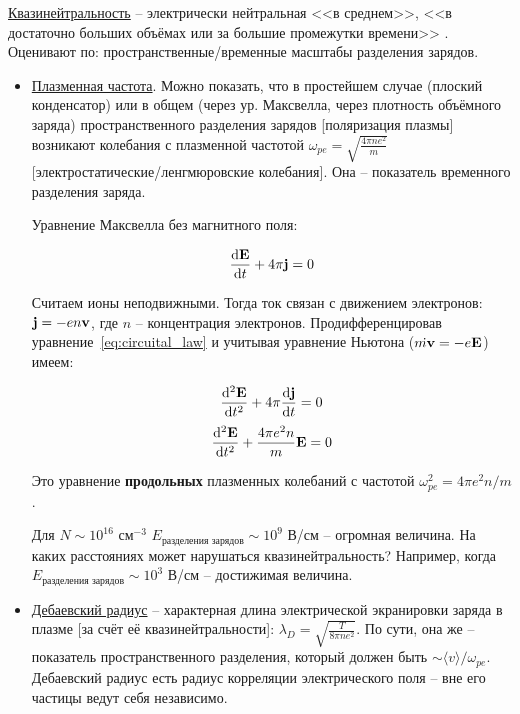\documentclass[10pt, a4paper]{article}
\begin{document}
\uline{Квазинейтральность} -- электрически нейтральная <<в среднем>>, <<в достаточно больших объёмах или за большие промежутки времени>> \cite{frank}. Оценивают по: пространственные/временные масштабы разделения зарядов.

\begin{itemize}
	\item \uline{Плазменная частота}. Можно показать, что в простейшем случае (плоский конденсатор) или в общем (через ур. Максвелла, через плотность объёмного заряда) пространственного разделения зарядов [поляризация плазмы] возникают колебания с плазменной частотой $\omega_{pe} = \sqrt{\frac{4\pi n e^2}{m}}$ [электростатические/ленгмюровские колебания]. Она -- показатель временного разделения заряда.
	
	Уравнение Максвелла без магнитного поля:
	
	\begin{equation}
		\label{eq:circuital_law}
		\dv{\vb{E}}{t} + 4\pi \vb{j} = 0
	\end{equation}

	Считаем ионы неподвижными. Тогда ток связан с движением электронов: $\vb{j}=-en\vb{v}$, где $n$ -- концентрация электронов. Продифференцировав уравнение~\eqref{eq:circuital_law} и учитывая уравнение Ньютона ($\dot{m\vb{v}}=-e\vb{E}$) имеем:
	
	\begin{equation*}
		\dv[2]{\vb{E}}{t}+4\pi\dv{\vb{j}}{t} = 0
	\end{equation*}
	\begin{equation}
		\dv[2]{\vb{E}}{t}+\frac{4\pi e^2 n}{m}\vb{E} = 0 
	\end{equation}

	Это уравнение \textbf{продольных} плазменных колебаний с частотой $\omega_{pe}^2=4\pi e^2 n/m$.
	
	Для $N\sim 10^{16}$ см$^{-3}$ $E_\text{разделения зарядов} \sim 10^9$ В/см -- огромная величина. На каких расстояниях может нарушаться квазинейтральность? Например, когда $E_\text{разделения зарядов} \sim 10^3$ В/см -- достижимая величина.
	
	\item \uline{Дебаевский радиус} -- характерная длина электрической экранировки заряда в плазме [за счёт её квазинейтральности]: $\lambda_D = \sqrt{\frac{T}{8\pi ne^2}}$. По сути, она же -- показатель пространственного разделения, который должен быть $\sim \langle v \rangle/\omega_{pe}$. Дебаевский радиус есть радиус корреляции электрического поля -- вне его частицы ведут себя независимо.
	

\end{itemize}
\end{document}
